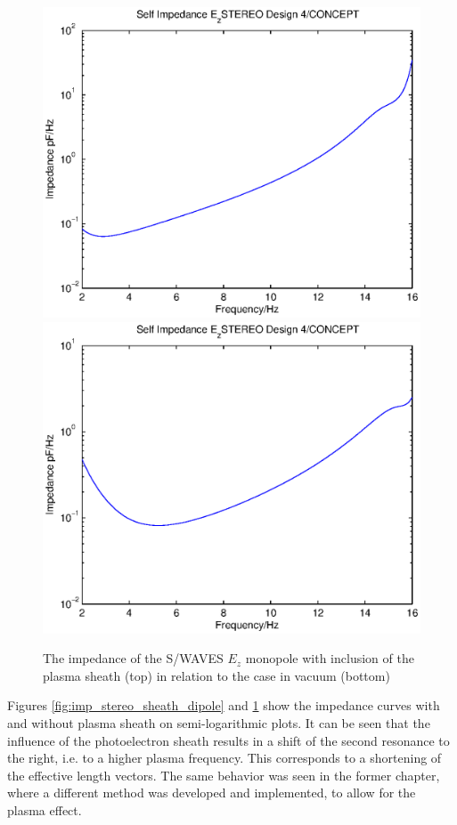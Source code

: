 \documentclass[a4paper,11pt]{thesis}
\begin{document}
\begin{figure}
\begin{center}
  \includegraphics[width=11.5cm]{DissPics/impedance_stereo_mono_vac.eps}
\includegraphics[width=11.5cm]{DissPics/impedance_stereo_mono_sheath.eps}
  \caption{The impedance of the S/WAVES $E_z$ monopole with inclusion of the plasma sheath (top) in relation to the case in vacuum (bottom)}\label{fig:imp_stereo_sheath_mono}
  \end{center}
\end{figure}


Figures \ref{fig:imp_stereo_sheath_dipole} and \ref{fig:imp_stereo_sheath_mono} show the impedance curves with and without plasma sheath on semi-logarithmic plots. It can be seen that the influence of the photoelectron sheath results in a shift of the second resonance to the right, i.e. to a higher plasma frequency. This corresponds to a shortening of the effective length vectors. The same behavior was seen in the former chapter, where a different method was developed and implemented, to allow for the plasma effect.
\end{document}
